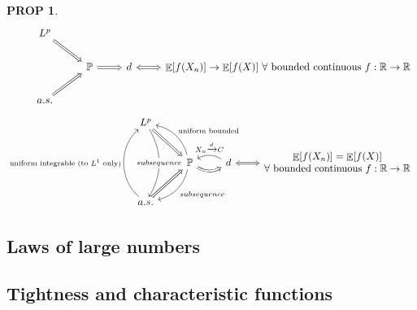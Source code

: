\documentclass[hidelinks,11pt]{article}
\theoremstyle{definition}
\theoremstyle{dotless}
\newtheorem{prop}{PROP}[section]
\theoremstyle{remark}
\DeclareMathOperator{\E}{\mathbb{E}}
\begin{document}
\begin{prop}
\[\begin{tikzcd}
&L^p\arrow[dr,Rightarrow]\\
&&\mathbb{P}\arrow[r,Rightarrow]& d\arrow[r,Leftrightarrow]&\E[f(X_n)]\to\E[f(X)]\ \forall\textrm{ bounded continuous }f:\mathbb{R}\to\mathbb{R}\\
&a.s.\arrow[ur,Rightarrow]
\end{tikzcd}\]
\[\begin{tikzcd}
L^p \arrow[rd, Rightarrow] \arrow[dd, "subsequence" description, bend left]       &                                                                                                                      &                                                            &    \\
                                                                                  & \mathbb{P} \arrow[r, Rightarrow, bend right] \arrow[lu, "\textrm{uniform bounded}"', bend right] \arrow[ld, "subsequence", bend left] & d \arrow[r, Leftrightarrow] \arrow[l, "X_n\xrightarrow{d} C"', bend right] & \begin{matrix}
                    \E[f(X_n)]=\E[f(X)]\\              \forall\textrm{ bounded continuous }f:\mathbb{R}\to\mathbb{R} \end{matrix}\\
a.s. \arrow[ru, Rightarrow] \arrow[uu, "\textrm{uniform integrable (to }L^1\textrm{ only)}", bend left=49] &                                                                                                                      &                                                            & 
\end{tikzcd}\]
\end{prop}


\subsection{Laws of large numbers}

\subsection{Tightness and characteristic functions}
\end{document}
